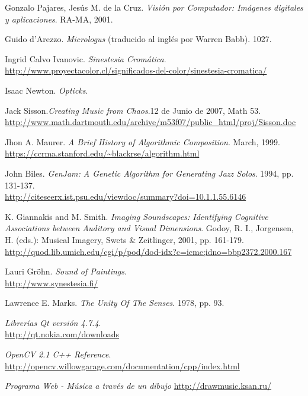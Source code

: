 \begin{thebibliography}{9}
 Gonzalo Pajares, Jesús M. de la Cruz. \emph{Visión por Computador: Imágenes digitales y aplicaciones}. RA-MA, 2001.

 Guido d'Arezzo. \emph{Micrologus} (traducido al inglés por Warren Babb). 1027.

 Ingrid Calvo Ivanovic. \emph{Sinestesia Cromática}.
 \url{http://www.proyectacolor.cl/significados-del-color/sinestesia-cromatica/}

 Isaac Newton. \emph{Opticks}.

Jack Sisson.\emph{Creating Music from Chaos}.12 de Junio de 2007, Math 53.\\
\url{http://www.math.dartmouth.edu/archive/m53f07/public_html/proj/Sisson.doc}

 Jhon A. Maurer. \emph{A Brief History of Algorithmic Composition}. March, 1999.
 \url{https://ccrma.stanford.edu/~blackrse/algorithm.html}

 John Biles. \emph{GenJam: A Genetic Algorithm for Generating Jazz Solos}. 1994, pp. 131-137.\\
 \url{http://citeseerx.ist.psu.edu/viewdoc/summary?doi=10.1.1.55.6146}

 K. Giannakis and M. Smith. \emph{Imaging Soundscapes: Identifying Cognitive Associations between Auditory and Visual Dimensions}. Godoy, R. I., Jorgensen, H. (eds.): Musical Imagery, Swets \& Zeitlinger, 2001, pp. 161-179.\\
 \url{http://quod.lib.umich.edu/cgi/p/pod/dod-idx?c=icmc;idno=bbp2372.2000.167}

Lauri Gröhn. \emph{Sound of Paintings}.\\
\url{http://www.synestesia.fi/}

 Lawrence E. Marks. \emph{The Unity Of The Senses}. 1978, pp. 93.

  \emph{Librerías Qt versión 4.7.4}.\\
  \url{http://qt.nokia.com/downloads}

  \emph{OpenCV 2.1 C++ Reference}.\\
  \url{http://opencv.willowgarage.com/documentation/cpp/index.html}

\emph{Programa Web - Música a través de un dibujo}
\url{http://drawmusic.ksan.ru/}


\end{thebibliography}
